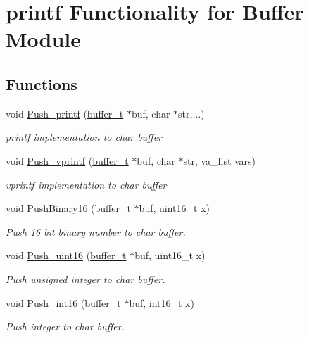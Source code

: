 \hypertarget{group__buffer__printf}{}\section{printf Functionality for Buffer Module}
\label{group__buffer__printf}
\subsection*{Functions}
\begin{DoxyCompactItemize}
\item 
void \hyperlink{group__buffer__printf_gab003a6708a2b979e7910c68adcab9f3c}{Push\+\_\+printf} (\hyperlink{structbuffer__t}{buffer\+\_\+t} $\ast$buf, char $\ast$str,...)
\begin{DoxyCompactList}\small\item\em printf implementation to char buffer \end{DoxyCompactList}\item 
void \hyperlink{group__buffer__printf_ga893906e6b7b5cb026c0084dda73b9f76}{Push\+\_\+vprintf} (\hyperlink{structbuffer__t}{buffer\+\_\+t} $\ast$buf, char $\ast$str, va\+\_\+list vars)
\begin{DoxyCompactList}\small\item\em vprintf implementation to char buffer \end{DoxyCompactList}\item 
void \hyperlink{group__buffer__printf_gacba148d6061ff774027ad014e5c5640c}{Push\+Binary16} (\hyperlink{structbuffer__t}{buffer\+\_\+t} $\ast$buf, uint16\+\_\+t x)
\begin{DoxyCompactList}\small\item\em Push 16 bit binary number to char buffer. \end{DoxyCompactList}\item 
void \hyperlink{group__buffer__printf_gad72750cbd158a3b49c544426e00ee923}{Push\+\_\+uint16} (\hyperlink{structbuffer__t}{buffer\+\_\+t} $\ast$buf, uint16\+\_\+t x)
\begin{DoxyCompactList}\small\item\em Push unsigned integer to char buffer. \end{DoxyCompactList}\item 
void \hyperlink{group__buffer__printf_gaee96546229e607ffe14f0fa18d424f84}{Push\+\_\+int16} (\hyperlink{structbuffer__t}{buffer\+\_\+t} $\ast$buf, int16\+\_\+t x)
\begin{DoxyCompactList}\small\item\em Push integer to char buffer. \end{DoxyCompactList}\item 

\end{DoxyCompactItemize}

